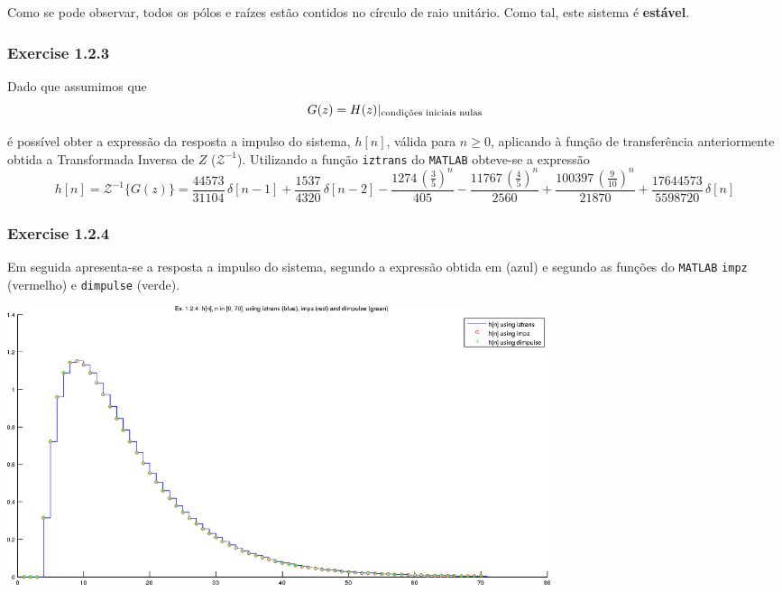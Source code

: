 \documentclass[a4paper]{article}
\begin{document}
\noindent Como se pode observar, todos os pólos e raízes estão contidos no círculo de raio unitário. Como tal, este sistema é \textbf{estável}.

\subsubsection{Exercise 1.2.3}
\label{subsubsec:ex1_2_3}
\noindent Dado que assumimos que
\begin{equation}
	G(z) = H(z)|_{\text{condições iniciais nulas}} \\
\end{equation}

\noindent é possível obter a expressão da resposta a impulso do sistema, $h[n]$, válida para $n \ge 0$, aplicando à função de transferência anteriormente obtida a Transformada Inversa de $Z$ ($\mathcal{Z}^{-1}$). Utilizando a função \texttt{iztrans} do \texttt{MATLAB} obteve-se a expressão
\begin{equation}
	h[n] = \mathcal{Z}^{-1}\{G(z)\} = \frac{44573}{31104} \, \delta[n - 1] + \frac{1537}{4320} \, \delta[n - 2] - \frac{1274 \, (\frac{3}{5}) ^ n}{405} - \frac{11767 \, (\frac{4}{5}) ^ n}{2560} + \frac{100397 \, (\frac{9}{10}) ^ n}{21870} + \frac{17644573}{5598720} \, \delta[n]
\end{equation}

\subsubsection{Exercise 1.2.4}
\noindent Em seguida apresenta-se a resposta a impulso do sistema, segundo a expressão obtida em \emph{} (azul) e segundo as funções do \texttt{MATLAB} \texttt{impz} (vermelho) e \texttt{dimpulse} (verde).

\begin{center}
	\includegraphics[width=0.70\textwidth]{images/ex1_2_4.png}
	\label{fig:ex1_2_4_zplane}
\end{center}
\end{document}
